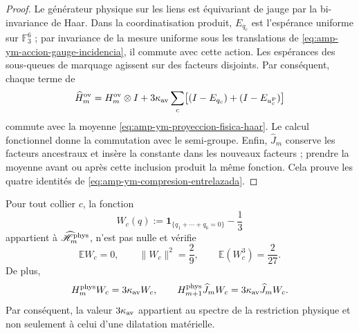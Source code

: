 \begin{proof}
Le générateur physique sur les liens est équivariant de jauge par la bi-invariance de Haar. Dans la coordinatisation produit, \(E_{q_c}\) est l'espérance uniforme sur \(\mathbb F_3^6\) ; par invariance de la mesure uniforme sous les translations de \eqref{eq:amp-ym-accion-gauge-incidencia}, il commute avec cette action. Les espérances des sous-queues de marquage agissent sur des facteurs disjoints. Par conséquent, chaque terme de
\[
 \widehat H_m^{\rm ov}
 =H_m^{\rm ov}\otimes I
 +3\kappa_{\rm av}\sum_c
 \bigl[(I-E_{q_c})+(I-E_{u_c^{\rm P}})\bigr]
\]
commute avec la moyenne \eqref{eq:amp-ym-proyeccion-fisica-haar}. Le calcul fonctionnel donne la commutation avec le semi-groupe. Enfin, \(\widehat J_m\) conserve les facteurs ancestraux et insère la constante dans les nouveaux facteurs ; prendre la moyenne avant ou après cette inclusion produit la même fonction. Cela prouve les quatre identités de \eqref{eq:amp-ym-compresion-entrelazada}.
\end{proof}

\begin{lemma}
\label{lem:amp-ym-testigo-fisico-q6}
Pour tout collier \(c\), la fonction
\begin{equation}\label{eq:amp-ym-testigo-fisico-def}
 W_c(q)
 :=\mathbf 1_{\{q_1+\cdots+q_6=0\}}-\frac13
\end{equation}
appartient à \(\widehat{\mathscr H}_m^{\rm phys}\), n’est pas nulle et vérifie
\begin{equation}\label{eq:amp-ym-testigo-fisico-momentos}
 \mathbb E W_c=0,\qquad
 \|W_c\|^2=\frac29,\qquad
 \mathbb E(W_c^3)=\frac2{27}.
\end{equation}
De plus,
\begin{equation}\label{eq:amp-ym-testigo-fisico-gap}
 H_m^{\rm phys}W_c=3\kappa_{\rm av}W_c,\qquad
 H_{m+1}^{\rm phys}\widehat J_mW_c
 =3\kappa_{\rm av}\widehat J_mW_c.
\end{equation}
Par conséquent, la valeur \(3\kappa_{\rm av}\) appartient au spectre de la
restriction physique et non seulement à celui d’une dilatation matérielle.
\end{lemma}

